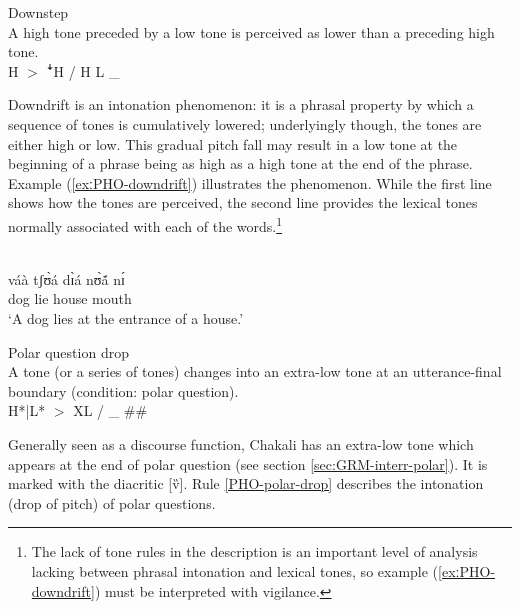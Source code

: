 \begin{Rule}\label{PHO-downstep}{Downstep}\\
A high tone preceded by a low tone is perceived as lower than a preceding high
tone.\\
 H $>$  {\I ꜜ}H  / H  L \_
\end{Rule}

Downdrift is an intonation phenomenon: it is a
phrasal property by which a sequence of tones is cumulatively
lowered; underlyingly though, the tones are either high or low. This
gradual pitch fall may result in a low tone at the beginning of a phrase being 
as high as a high tone at the end of the phrase. Example
(\ref{exːPHO-downdrift}) illustrates the
phenomenon. While the first line shows how the tones are perceived, the second
line provides the lexical  tones normally associated with each of the
words.\footnote{The lack of tone rules in the  description is an important 
level of analysis lacking between phrasal intonation and lexical tones,  so
example 
(\ref{exːPHO-downdrift}) must be interpreted with vigilance.}


\begin{exe}
\ex\label{exːPHO-downdrift}

 {\T } {\T  } {\T } {\T }\\
váà tʃʊ̀á dɪ̀á nʊ̀ã́ nɪ́ \\
dog lie house mouth {\postp} \\
\glt  `A dog lies at the entrance of a house.'
\end{exe}


\begin{Rule}\label{PHO-polar-drop}{Polar question drop}\\
A tone (or a series of tones) changes into an extra-low tone at an
utterance-final boundary (condition:  polar question).\\
H*|L*  $>$  XL  /  \_ \#\#
\end{Rule}



Generally seen as a discourse function, Chakali has an extra-low tone  which
appears at the end of  polar question (see section
\ref{sec:GRM-interr-polar}). It is marked with
the diacritic [v̏]. 
Rule \ref{PHO-polar-drop} describes the intonation (drop of pitch) of  polar
questions.







